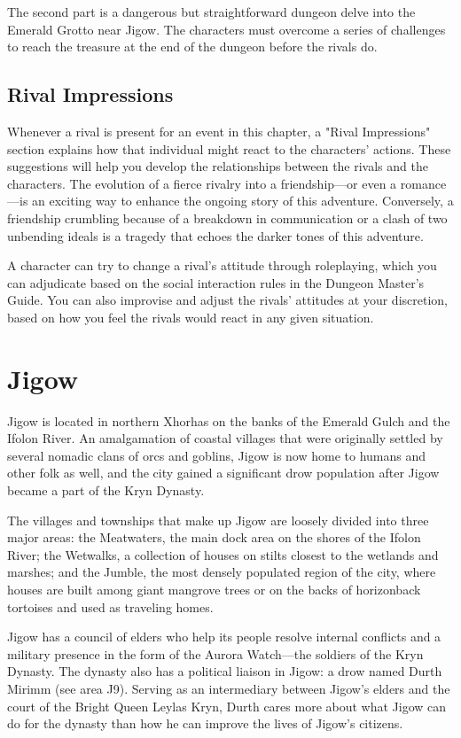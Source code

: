 \documentclass[10pt,a4paper,twoside,twocolumn,openany,nodeprecatedcode]{dndbook}
\begin{document}
The second part is a dangerous but straightforward dungeon delve into the Emerald Grotto near Jigow. The characters must overcome a series of challenges to reach the treasure at the end of the dungeon before the rivals do.

\subsection{Rival Impressions}
Whenever a rival is present for an event in this chapter, a "Rival Impressions" section explains how that individual might react to the characters' actions. These suggestions will help you develop the relationships between the rivals and the characters. The evolution of a fierce rivalry into a friendship—or even a romance—is an exciting way to enhance the ongoing story of this adventure. Conversely, a friendship crumbling because of a breakdown in communication or a clash of two unbending ideals is a tragedy that echoes the darker tones of this adventure.

A character can try to change a rival's attitude through roleplaying, which you can adjudicate based on the social interaction rules in the Dungeon Master's Guide. You can also improvise and adjust the rivals' attitudes at your discretion, based on how you feel the rivals would react in any given situation.

\section{Jigow}
Jigow is located in northern Xhorhas on the banks of the Emerald Gulch and the Ifolon River. An amalgamation of coastal villages that were originally settled by several nomadic clans of orcs and goblins, Jigow is now home to humans and other folk as well, and the city gained a significant drow population after Jigow became a part of the Kryn Dynasty.

The villages and townships that make up Jigow are loosely divided into three major areas: the Meatwaters, the main dock area on the shores of the Ifolon River; the Wetwalks, a collection of houses on stilts closest to the wetlands and marshes; and the Jumble, the most densely populated region of the city, where houses are built among giant mangrove trees or on the backs of horizonback tortoises and used as traveling homes.

Jigow has a council of elders who help its people resolve internal conflicts and a military presence in the form of the Aurora Watch—the soldiers of the Kryn Dynasty. The dynasty also has a political liaison in Jigow: a drow named Durth Mirimm (see area J9). Serving as an intermediary between Jigow's elders and the court of the Bright Queen Leylas Kryn, Durth cares more about what Jigow can do for the dynasty than how he can improve the lives of Jigow's citizens.
\end{document}
